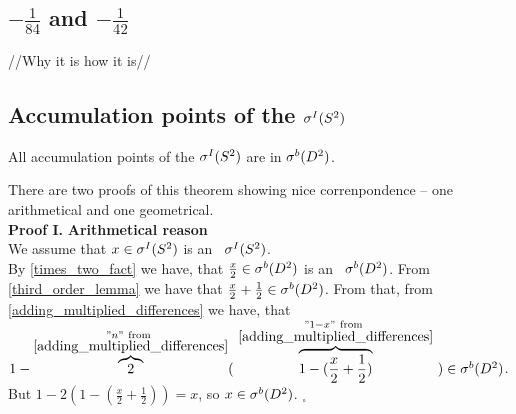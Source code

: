 \subsection{$-\frac{1}{84}$ and $-\frac{1}{42}$}
//Why it is how it is//
\subsection{Accumulation points of the ${\mathcal{\sigma}^I(S^2)}$}
\begin{theorem}
All accumulation points of the ${\mathcal{\sigma}^I(S^2)}$ are in ${\mathcal{\sigma}^b(D^2)}$.
\end{theorem}
There are two proofs of this theorem showing nice correnpondence -- one arithmetical and 
one geometrical. 
\\
\textbf{Proof I.}
\textbf{Arithmetical reason} \\
We assume that $x \in {\mathcal{\sigma}^I(S^2)}$ is an \apots\ ${\mathcal{\sigma}^I(S^2)}$.\\
By \ref{times_two_fact} we have, that 
$\frac{x}{2} \in {\mathcal{\sigma}^b(D^2)}$ is an \apots\ ${\mathcal{\sigma}^b(D^2)}$. From \ref{third_order_lemma} we have that 
$\frac{x}{2} + \frac{1}{2} \in {\mathcal{\sigma}^b(D^2)}$. From that, from \ref{adding_multiplied_differences} we have, 
that $1-\overbrace{2}^{\substack{"n"\rm\ from\ \\ 
\rm \ref{adding_multiplied_differences}}} 
(\ \overbrace{1-(\frac{x}{2}+\frac{1}{2})}^{\substack{"1-x"\rm\ 
from\ \\ \rm \ref{adding_multiplied_differences}}}\ ) \in \sbD$. But $1 - 2(1-(\frac{x}{2}+
\frac{1}{2})) = x$, so $x \in {\mathcal{\sigma}^b(D^2)}$. $_\square$
\\[2pt]
